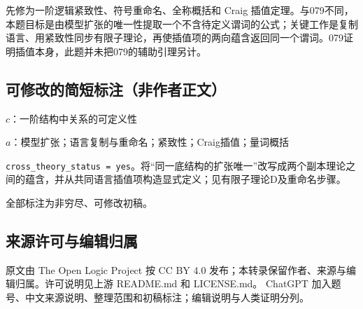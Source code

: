 \documentclass[UTF8,11pt]{ctexart}
\theoremstyle{definition}
\begin{document}
先修为一阶逻辑紧致性、符号重命名、全称概括和 Craig 插值定理。与079不同，本题目标是由模型扩张的唯一性提取一个不含待定义谓词的公式；关键工作是复制语言、用紧致性同步有限子理论，再使插值项的两向蕴含返回同一个谓词。079证明插值本身，此题并未把079的辅助引理另计。
\subsection*{可修改的简短标注（非作者正文）}
$c$：一阶结构中关系的可定义性

$a$：模型扩张；语言复制与重命名；紧致性；Craig插值；量词概括

\texttt{cross\_theory\_status = yes}。将“同一底结构的扩张唯一”改写成两个副本理论之间的蕴含，并从共同语言插值项构造显式定义；见有限子理论D及重命名步骤。

全部标注为非穷尽、可修改初稿。
\subsection*{来源许可与编辑归属}
原文由 The Open Logic Project 按 CC BY 4.0 发布；本转录保留作者、来源与编辑归属。许可说明见上游 README.md 和 LICENSE.md。
ChatGPT 加入题号、中文来源说明、整理范围和初稿标注；编辑说明与人类证明分列。
\end{document}
